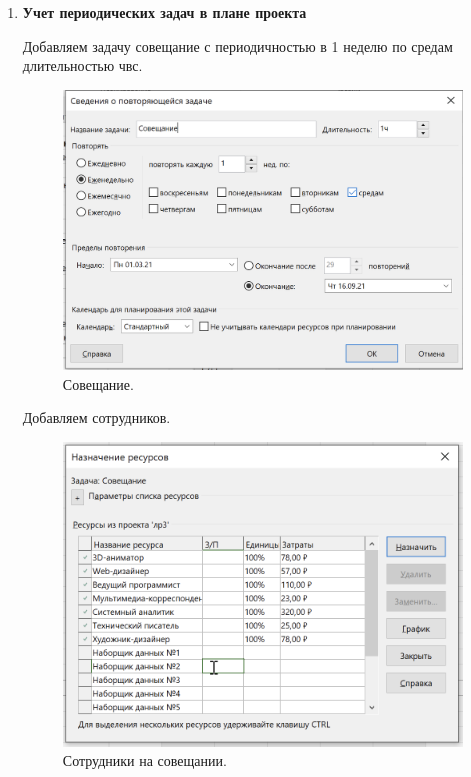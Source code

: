 \documentclass[a4paper,14pt]{extreport} %
\begin{document}
\begin{enumerate}
\item \textbf{Учет периодических задач в плане проекта}

Добавляем задачу совещание с периодичностью в 1 неделю по средам длительностью чвс.

\begin{figure}[H]
  \centering
  \caption{Совещание. }
  \includegraphics[scale=0.8]{3}
\end{figure}

Добавляем сотрудников.

\begin{figure}[H]
  \centering
  \caption{Сотрудники на совещании. }
  \includegraphics[scale=0.8]{4}
\end{figure}


\end{enumerate}
\end{document}
